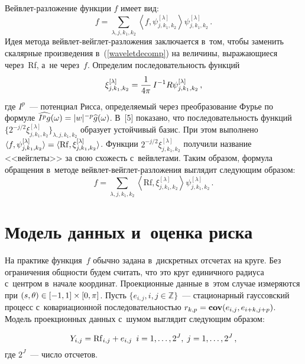 \begin{multicols}{2}
Вейвлет-разложение функции $f$ имеет вид:
\begin{equation}                                                                   
\label{waveletdecomp}
f = \sum\limits_{\lambda,j,k_1,k_2} \left\langle f,\psi^{[\lambda]}_{j,k_1,k_2}
\right\rangle \psi^{[\lambda]}_{j,k_1,k_2}\,.
\end{equation}
Идея метода вейвлет-вейг\-лет-раз\-ло\-же\-ния заключается 
в~том, чтобы заменить скалярные произведения в~(\ref{waveletdecomp}) на 
величины, выражающиеся через~Rf, а~не через~$f$. Определим последовательность 
\mbox{функций}
\begin{equation*}
\xi_{j,k_1,k_2}^{[\lambda]} = \displaystyle\frac{\displaystyle 1\mathstrut}{\displaystyle 4\pi\mathstrut}\, I^{-1} R \psi_{j,k_1,k_2}^{[\lambda]}\,,
\end{equation*}
где $I^{p}$~--- потенциал Рисса, определяемый через преобразование 
Фурье по формуле $\widehat{ I^{p} g}(\omega) \hm= |w|^{-p} \widehat{g}(\omega)$. 
В~[5] показано, что последовательность функций 
$\{2^{-j/2}\xi_{j,k_1,k_2}^{[\lambda]}\}_{\lambda,j,k_1,k_2}$ образует устойчивый базис. 
При этом выполнено $\langle f,\psi_{j,k_1,k_2}^{[\lambda]}\rangle
\hm=\langle \mathrm{Rf}, \xi_{j,k_1,k_2}^{[\lambda]}\rangle $. 
Функции $2^{-j/2}\xi_{j,k_1,k_2}^{[\lambda]}$ получили название 
<<вейглеты>> за свою схожесть с~вейвлетами. Таким образом, формула обращения 
в~методе вей\-влет-вейг\-лет-раз\-ло\-же\-ния выглядит следующим образом:
\begin{equation*}
f = \sum\limits_{\lambda,j,k_1,k_2} \left\langle \mathrm{Rf}, \xi_{j,k_1,k_2}^{[\lambda]}\right\rangle 
\psi^{[\lambda]}_{j,k_1,k_2}\,.
\end{equation*}

\section{Модель данных и~оценка риска}

На практике функция~$f$ обычно задана в~дискретных отсчетах на круге. 
Без ограничения общ\-ности будем считать, что это круг единичного радиу\-са с~центром 
в~начале координат. Проекционные данные в~этом случае измеряются 
при $(s,\theta)\hm\in [-1,1]\times[0,\pi]$.
Пусть $\{e_{i,j}, i,j \in \mathbb{Z}\}$~--- стационарный гауссовский процесс 
с~ковариационной последовательностью $r_{k,p} \hm= \textbf{cov} (e_{i,j},e_{i+k,j+p})$.
Модель проекционных данных с~шумом выглядит сле\-ду\-ющим образом:

\noindent
\begin{equation*}
Y_{i,j} = \mathrm{Rf}_{i,j}+e_{i,j} \enskip i = 1, \dots, 2^J, \; j = 1, \dots, 2^J\,,
\end{equation*}
где $2^J$~--- число отсчетов.


\end{multicols}
